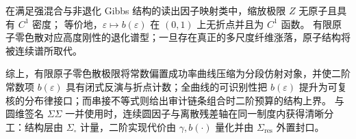 \begin{conjecture}[混合型纤维谱的绝对连续性与二阶曲线光滑性]\label{conj:xi-zero-dispersion-atomless-smooth-b}
在满足强混合与非退化 Gibbs 结构的读出因子映射类中，缩放极限 \(Z\) 无原子且具有 \(C^{1}\) 密度；
等价地，\(\varepsilon\mapsto b(\varepsilon)\) 在 \((0,1)\) 上无折点并且为 \(C^{1}\) 函数。
有限原子零色散对应高度刚性的退化谱型；一旦存在真正的多尺度纤维涨落，原子结构将被连续谱所取代。
\end{conjecture}

\par
综上，有限原子零色散极限将常数偏置成功率曲线压缩为分段仿射对象，并使二阶常数项 \(b(\varepsilon)\) 具有闭式反演与折点计数；全曲线的可识别性把 \(b(\varepsilon)\) 提升为可复核的分布律接口；而串接不等式则给出审计链条组合时二阶预算的结构上界。
与圆维签名 \(\Sigma\Sigma\) 一并使用时，连续圆因子与离散残差轴在同一制度内获得清晰分工：结构层由 \(\Sigma_{\circ}\) 计量，二阶实现代价由 \(\gamma,b(\cdot)\) 量化并由 \(\Sigma_{\mathrm{res}}\) 外置封口。

\endinput
